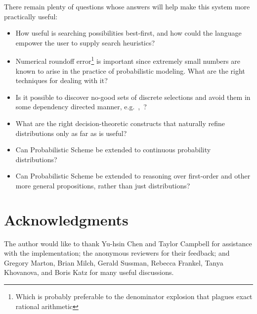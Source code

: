 \documentclass[10pt]{sigplanconf}
\begin{document}
There remain plenty of questions whose answers will help make
this system more practically useful:
\begin{itemize}
\item How useful is searching possibilities best-first,
and how could the language empower the user to supply search heuristics?
\item Numerical roundoff error\footnote{Which is probably preferable to
the denominator explosion that plagues exact rational arithmetic}
is important since extremely small
numbers are known to arise in the practice of probabilistic modeling.
What are the right techniques for dealing with it?
\item Is it possible to discover no-good sets of discrete selections and avoid
them in some dependency directed manner,
e.g.~\cite{bacchus03value},~\cite{stallman-sussman-reasoning}?
\item What are the right decision-theoretic constructs that naturally
refine distributions only as far as is useful?
\item Can Probabilistic Scheme be extended to continuous probability
distributions?
\item Can Probabilistic Scheme be extended to reasoning over
first-order and other more general propositions, rather than just
distributions?
\end{itemize}

\section{Acknowledgments}

The author would like to thank Yu-hsin Chen and Taylor Campbell for
assistance with the implementation; the anonymous reviewers for their
feedback; and Gregory Marton, Brian Milch, Gerald Sussman, Rebecca
Frankel, Tanya Khovanova, and Boris Katz for many useful discussions.
\end{document}
